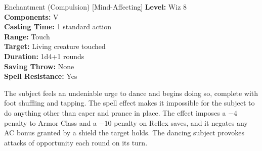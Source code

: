 {Enchantment (Compulsion) [Mind-Affecting]}
{
	\textbf{Level:}
	Wiz 8\\
	\textbf{Components:}
	V\\
	\textbf{Casting Time:}
	1 standard action\\
	\textbf{Range:}
	Touch\\
	\textbf{Target:}
	Living creature touched\\
	\textbf{Duration:}
	1d4+1 rounds\\
	\textbf{Saving Throw:}
	None\\
	\textbf{Spell Resistance:}
	Yes\\
}
{
	The subject feels an undeniable urge to dance and begins doing so, complete with foot shuffling and tapping. The spell effect makes it impossible for the subject to do anything other than caper and prance in place. The effect imposes a $-4$ penalty to Armor Class and a $-10$ penalty on Reflex saves, and it negates any AC bonus granted by a shield the target holds. The dancing subject provokes attacks of opportunity each round on its turn.

}
